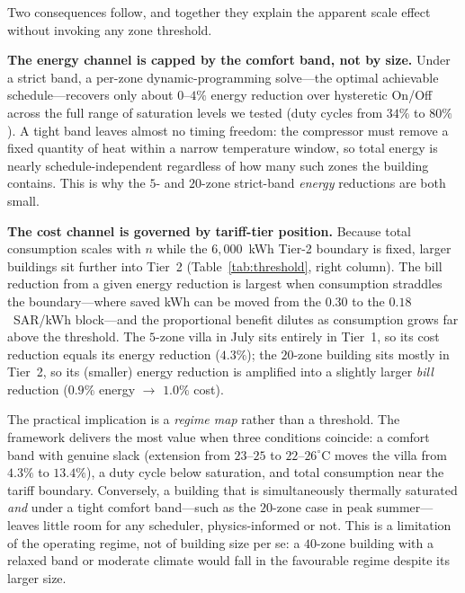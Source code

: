 \documentclass[12pt,a4paper]{article}
\begin{document}
\noindent Two consequences follow, and together they explain the apparent scale effect without invoking any zone threshold.

\textbf{The energy channel is capped by the comfort band, not by size.} Under a strict band, a per-zone dynamic-programming solve---the optimal achievable schedule---recovers only about $0$--$4\%$ energy reduction over hysteretic On/Off across the full range of saturation levels we tested (duty cycles from $34\%$ to $80\%$). A tight band leaves almost no timing freedom: the compressor must remove a fixed quantity of heat within a narrow temperature window, so total energy is nearly schedule-independent regardless of how many such zones the building contains. This is why the $5$- and $20$-zone strict-band \emph{energy} reductions are both small.

\textbf{The cost channel is governed by tariff-tier position.} Because total consumption scales with $n$ while the $6{,}000$~kWh Tier-2 boundary is fixed, larger buildings sit further into Tier~2 (Table~\ref{tab:threshold}, right column). The bill reduction from a given energy reduction is largest when consumption straddles the boundary---where saved kWh can be moved from the $0.30$ to the $0.18$~SAR/kWh block---and the proportional benefit dilutes as consumption grows far above the threshold. The $5$-zone villa in July sits entirely in Tier~1, so its cost reduction equals its energy reduction ($4.3\%$); the $20$-zone building sits mostly in Tier~2, so its (smaller) energy reduction is amplified into a slightly larger \emph{bill} reduction ($0.9\%$ energy $\to$ $1.0\%$ cost).

The practical implication is a \emph{regime map} rather than a threshold. The framework delivers the most value when three conditions coincide: a comfort band with genuine slack (extension from $23$--$25$ to $22$--$26^\circ$C moves the villa from $4.3\%$ to $13.4\%$), a duty cycle below saturation, and total consumption near the tariff boundary. Conversely, a building that is simultaneously thermally saturated \emph{and} under a tight comfort band---such as the $20$-zone case in peak summer---leaves little room for any scheduler, physics-informed or not. This is a limitation of the operating regime, not of building size per se: a $40$-zone building with a relaxed band or moderate climate would fall in the favourable regime despite its larger size.
\end{document}
